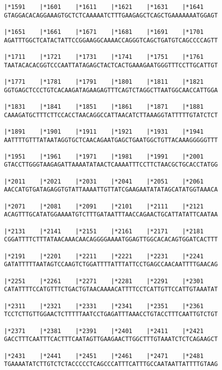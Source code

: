 \documentclass{article}
\begin{document}
\begin{Verbatim}[fontfamily=courier]
|*1591    |*1601    |*1611    |*1621    |*1631    |*1641    
GTAGGACACAGGAAAGTGCTCTCAAAAATCTTTGAAGAGCTCAGCTGAAAAAAATGGAGT

|*1651    |*1661    |*1671    |*1681    |*1691    |*1701    
AGATTTGGCTCATACTATTCCGGAAGGCAAAACCAGGGTCAGCTGATGTCAGCCCCAGTT

|*1711    |*1721    |*1731    |*1741    |*1751    |*1761    
TAATACACACGGTCCCAATTATAGAGCTACTCACTGAAAGAATGGGTTTCCTTGCATTGT

|*1771    |*1781    |*1791    |*1801    |*1811    |*1821    
GGTGAGCTCCCTGTCACAAGATAGAAGAGTTTCAGTCTAGGCTTAATGGCAACCATTGGA

|*1831    |*1841    |*1851    |*1861    |*1871    |*1881    
CAAAGATGCTTTCTTCCACCTAACAGGCCATTAACATCTTAAAGGTATTTTTGTATCTCT

|*1891    |*1901    |*1911    |*1921    |*1931    |*1941    
AATTTTGTTTATAATAGGTGCTCAACAGAATGAGCTGAATGGCTGTTACAAAGGGGGTTT

|*1951    |*1961    |*1971    |*1981    |*1991    |*2001    
GTACCTTGGGTAAGAGATTAAAATATAACTCAAAATTTCCTTCTAACGCTGCACCTATGG

|*2011    |*2021    |*2031    |*2041    |*2051    |*2061    
AACCATGTGATAGAGGTGTATTAAAATTGTTATCGAAGAATATATAGCATATGGTAAACA

|*2071    |*2081    |*2091    |*2101    |*2111    |*2121    
ACAGTTTGCATATGGAAAATGTCTTTGATAATTTAACCAGAACTGCATTATATTCAATAA

|*2131    |*2141    |*2151    |*2161    |*2171    |*2181    
CGGATTTTCTTTATAACAAACAACAGGGGAAAATGGAGTTGGCACACAGTGGATCACTTT

|*2191    |*2201    |*2211    |*2221    |*2231    |*2241    
GATATTTTTAATAGTCCAAGTCTGGATTTTATTTATTCCTGAGCCAACAATTTTGAACAG

|*2251    |*2261    |*2271    |*2281    |*2291    |*2301    
CATATTTTCCATGTTTCTGACTGTAACAAAACATTTTCCTCATTGTTCCATTGTAAATAT

|*2311    |*2321    |*2331    |*2341    |*2351    |*2361    
TCCTCTTGTTGGAACTCTTTTTAATCCTGAGATTTAAACCTGTACCTTTCAATTGTCTGT

|*2371    |*2381    |*2391    |*2401    |*2411    |*2421    
GACCTTTCAATTTCACTTTCAATAGTTGAAGAACTTGGCTTTGTAAATCTCTCAGAAGCT

|*2431    |*2441    |*2451    |*2461    |*2471    |*2481    
TGAAAATATCTTGTCTCTACCCCCTCAGCCCATTTCATTTGCCAATAATTATTTTGTAAG

\end{Verbatim}
\newpage
\end{document}
